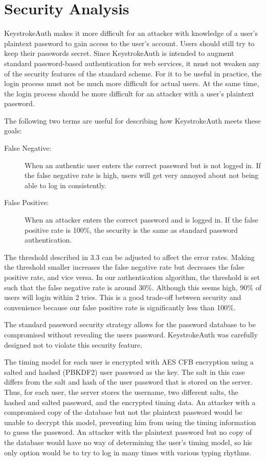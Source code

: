 \documentclass{article}
\begin{document}
\section{Security Analysis}
KeystrokeAuth makes it more difficult for an attacker with knowledge of a user's plaintext password to gain access to the user's account.
Users should still try to keep their passwords secret.
Since KeystrokeAuth is intended to augment standard password-based authentication for web services, it must not weaken any of the security features of the standard scheme. 
For it to be useful in practice, the login process must not be much more difficult for actual users.
At the same time, the login process should be more difficult for an attacker with a user's plaintext password.

The following two terms are useful for describing how KeystrokeAuth meets these goals:

\begin{description}
  \item[False Negative:] When an authentic user enters the correct password but is not logged in. If the false negative rate is high, users will get very annoyed about not being able to log in consistently.
  \item[False Positive:] When an attacker enters the correct password and is logged in. If the false positive rate is 100\%, the security is the same as standard password authentication.
\end{description}

The threshold described in 3.3 can be adjusted to affect the error rates. 
Making the threshold smaller increases the false negative rate but decreases the false positive rate, and vice versa.
In our authentication algorithm, the threshold is set such that the false negative rate is around 30\%. Although this seems high, 90\% of users will login within 2 tries. This is a good trade-off between security and convenience because our false positive rate is significantly less than 100\%.

The standard password security strategy allows for the password database to be compromised without revealing the users password.
KeystrokeAuth was carefully designed not to violate this security feature.

The timing model for each user is encrypted with AES CFB encryption using a salted and hashed (PBKDF2) user password as the key. The salt in this case differs from the salt and hash of the user password that is stored on the server. Thus, for each user, the server stores the username, two different salts, the hashed and salted password, and the encrypted timing data. 
An attacker with a compromised copy of the database but not the plaintext password would be unable to decrypt this model, preventing him from using the timing information to guess the password.
An attacker with the plaintext password but no copy of the database would have no way of determining the user's timing model, so his only option would be to try to log in many times with various typing rhythms. 
\end{document}
